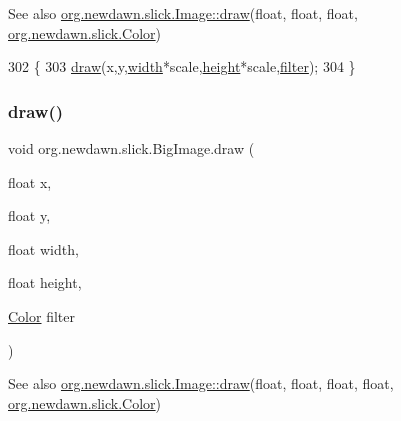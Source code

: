 \begin{DoxySeeAlso}{See also}
\mbox{\hyperlink{classorg_1_1newdawn_1_1slick_1_1_image_a9bddcca05c7140ab45df8ac5b250b6cd}{org.\+newdawn.\+slick.\+Image\+::draw}}(float, float, float, \mbox{\hyperlink{classorg_1_1newdawn_1_1slick_1_1_color}{org.\+newdawn.\+slick.\+Color}}) 
\end{DoxySeeAlso}

\begin{DoxyCode}
302                                                                   \{
303         \mbox{\hyperlink{classorg_1_1newdawn_1_1slick_1_1_big_image_a75b5b008adf93b038aa56e9cfefd1a1c}{draw}}(x,y,\mbox{\hyperlink{classorg_1_1newdawn_1_1slick_1_1_image_a7d02c85e21b388428cfe5cc5c82714a1}{width}}*scale,\mbox{\hyperlink{classorg_1_1newdawn_1_1slick_1_1_image_a54397a37823bc59ddc79ec70dc5cf226}{height}}*scale,\mbox{\hyperlink{classorg_1_1newdawn_1_1slick_1_1_image_a1c6f09687817420f3762f32bb1c3ed76}{filter}});
304     \}
\end{DoxyCode}
\mbox{\label{classorg_1_1newdawn_1_1slick_1_1_big_image_a92da30010cfd28306b7cba7fd6f04acb}} 
\subsubsection{\texorpdfstring{draw()}{draw()}\hspace{0.1cm}{\footnotesize\ttfamily [4/10]}}
{\footnotesize\ttfamily void org.\+newdawn.\+slick.\+Big\+Image.\+draw (\begin{DoxyParamCaption}\item[{float}]{x,  }\item[{float}]{y,  }\item[{float}]{width,  }\item[{float}]{height,  }\item[{\mbox{\hyperlink{classorg_1_1newdawn_1_1slick_1_1_color}{Color}}}]{filter }\end{DoxyParamCaption})\hspace{0.3cm}{\ttfamily [inline]}}

\begin{DoxySeeAlso}{See also}
\mbox{\hyperlink{classorg_1_1newdawn_1_1slick_1_1_image_a9bddcca05c7140ab45df8ac5b250b6cd}{org.\+newdawn.\+slick.\+Image\+::draw}}(float, float, float, float, \mbox{\hyperlink{classorg_1_1newdawn_1_1slick_1_1_color}{org.\+newdawn.\+slick.\+Color}}) 
\end{DoxySeeAlso}

